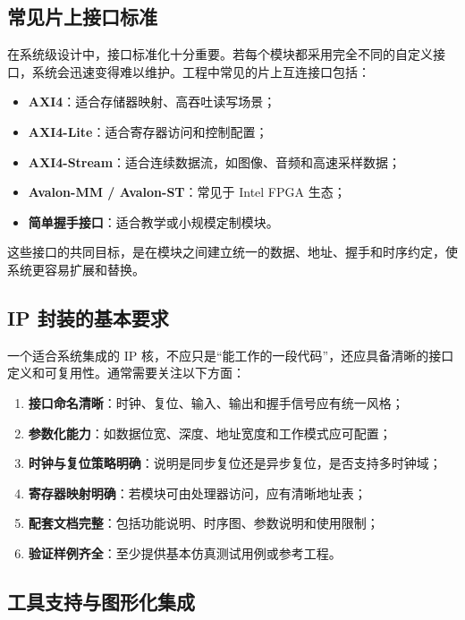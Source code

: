 \subsection{常见片上接口标准}\label{ux5e38ux89c1ux7247ux4e0aux63a5ux53e3ux6807ux51c6}

在系统级设计中，接口标准化十分重要。若每个模块都采用完全不同的自定义接口，系统会迅速变得难以维护。工程中常见的片上互连接口包括：

\begin{itemize}
\tightlist
\item
  \textbf{AXI4}：适合存储器映射、高吞吐读写场景；
\item
  \textbf{AXI4-Lite}：适合寄存器访问和控制配置；
\item
  \textbf{AXI4-Stream}：适合连续数据流，如图像、音频和高速采样数据；
\item
  \textbf{Avalon-MM / Avalon-ST}：常见于 Intel FPGA 生态；
\item
  \textbf{简单握手接口}：适合教学或小规模定制模块。
\end{itemize}

这些接口的共同目标，是在模块之间建立统一的数据、地址、握手和时序约定，使系统更容易扩展和替换。

\subsection{IP
封装的基本要求}\label{ip-ux5c01ux88c5ux7684ux57faux672cux8981ux6c42}

一个适合系统集成的 IP
核，不应只是``能工作的一段代码''，还应具备清晰的接口定义和可复用性。通常需要关注以下方面：

\begin{enumerate}
\def\labelenumi{\arabic{enumi}.}
\tightlist
\item
  \textbf{接口命名清晰}：时钟、复位、输入、输出和握手信号应有统一风格；
\item
  \textbf{参数化能力}：如数据位宽、深度、地址宽度和工作模式应可配置；
\item
  \textbf{时钟与复位策略明确}：说明是同步复位还是异步复位，是否支持多时钟域；
\item
  \textbf{寄存器映射明确}：若模块可由处理器访问，应有清晰地址表；
\item
  \textbf{配套文档完整}：包括功能说明、时序图、参数说明和使用限制；
\item
  \textbf{验证样例齐全}：至少提供基本仿真测试用例或参考工程。
\end{enumerate}

\subsection{工具支持与图形化集成}\label{ux5de5ux5177ux652fux6301ux4e0eux56feux5f62ux5316ux96c6ux6210}

